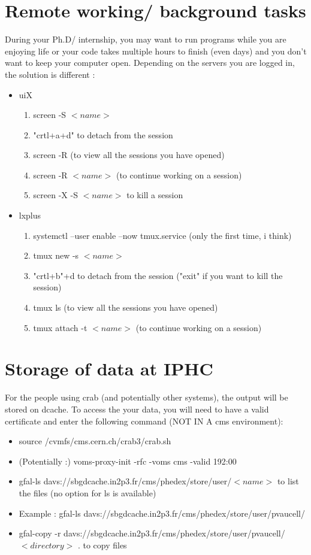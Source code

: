 \documentclass[reprint, a4paper, nofootinbib, amsmath, amssymb, aps]{revtex4-1}
\begin{document}
\section{Remote working/ background tasks}

During your Ph.D/ internship, you may want to run programs while you are enjoying life or your code takes multiple hours to finish (even days) and you don't want to keep your computer open. Depending on the servers you are logged in, the solution is different :

\begin{itemize}
    \item uiX \begin{enumerate}
        \item screen -S $<name>$
        \item  "crtl+a+d" to detach from the session
        \item screen -R (to view all the sessions you have opened)
        \item screen -R $<name>$ (to continue working on a session)
        \item screen -X -S $<name>$ to kill a session
    \end{enumerate}
    \item lxplus \begin{enumerate}
        \item systemctl --user enable --now tmux.service (only the first time, i think)
        \item tmux new -s $<name>$
        \item "crtl+b"+d to detach from the session ("exit" if you want to kill the session)
        \item tmux ls (to view all the sessions you have opened)
        \item tmux attach -t $<name>$ (to continue working on a session)
    \end{enumerate}
\end{itemize}
\section{Storage of data at IPHC}
For the people using crab (and potentially other systems), the output will be stored on dcache. To access the your data, you will need to have a valid certificate and enter the following command (NOT IN A cms environment):\begin{itemize}
    \item source /cvmfs/cms.cern.ch/crab3/crab.sh 
    \item (Potentially :) voms-proxy-init -rfc -voms cms -valid 192:00
    \item gfal-ls davs://sbgdcache.in2p3.fr/cms/phedex/store/user/$<name>$ to list the files (no option for ls is available)
    \item Example : gfal-ls davs://sbgdcache.in2p3.fr/cms/phedex/store/user/pvaucell/
    \item gfal-copy -r davs://sbgdcache.in2p3.fr/cms/phedex/store/user/pvaucell/$<directory>$ . to copy files
\end{itemize}
\end{document}
